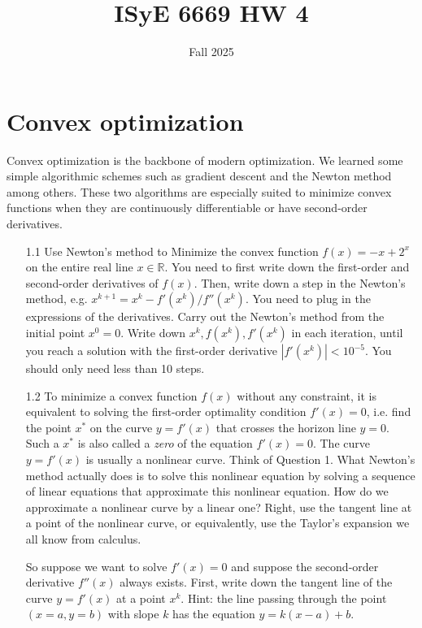 \documentclass{article}
\title{ISyE 6669 HW 4}
\date{Fall 2025}
\def\R{\mathbb{R}}
\begin{document}
\maketitle


\noindent

\section{Convex optimization}
Convex optimization is the backbone of modern optimization. We learned some simple algorithmic schemes such as gradient descent and the Newton method among others. These two algorithms are especially suited to minimize convex functions when they are continuously differentiable or have second-order derivatives.

\begin{enumerate}
    \item[1.1] Use Newton's method to Minimize the convex function $f(x)=-x+2^x$ on the entire real line $x\in\R$. You need to first write down the first-order and second-order derivatives of $f(x)$. Then, write down a step in the Newton's method, e.g. $x^{k+1} = x^k - f'(x^k)/f''(x^k)$. You need to plug in the expressions of the derivatives. Carry out the Newton's method from the initial point $x^0 = 0$. Write down $x^k, f(x^k), f'(x^k)$ in each iteration, until you reach a solution with the first-order derivative $|f'(x^k)|<10^{-5}$. You should only need less than 10 steps.
    
    \item[1.2] To minimize a convex function $f(x)$ without any constraint, it is equivalent to solving the first-order optimality condition $f'(x)=0$, i.e. find the point $x^*$ on the curve $y=f'(x)$ that crosses the horizon line $y=0$. Such a $x^*$ is also called a \emph{zero} of the equation $f'(x)=0$. The curve $y=f'(x)$ is usually a nonlinear curve. Think of Question 1. What Newton's method actually does is to solve this nonlinear equation by solving a sequence of linear equations that approximate this nonlinear equation. How do we approximate a nonlinear curve by a linear one? Right, use the tangent line at a point of the nonlinear curve, or equivalently, use the Taylor's expansion we all know from calculus. 
    
    So suppose we want to solve $f'(x)=0$ and suppose the second-order derivative $f''(x)$ always exists. First, write down the tangent line of the curve $y=f'(x)$ at a point $x^k$. Hint: the line passing through the point $(x=a,y=b)$ with slope $k$ has the equation $y=k(x-a)+b$. 
    

\end{enumerate}
\end{document}
